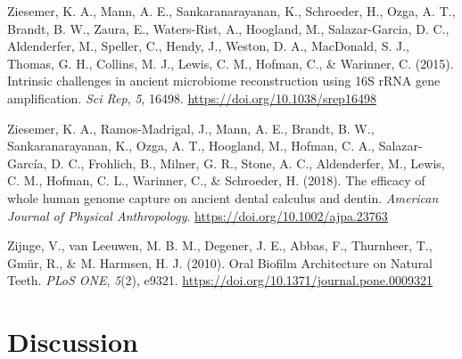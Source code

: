 \documentclass[
  b5paper,
]{book}
\newlength{\cslhangindent}
\newenvironment{CSLReferences}[2] %
 {\begin{list}{}{%
  \setlength{\itemindent}{0pt}
  \setlength{\leftmargin}{0pt}
  \setlength{\parsep}{0pt}
  \ifodd #1
   \setlength{\leftmargin}{\cslhangindent}
   \setlength{\itemindent}{-1\cslhangindent}
  \fi
  \setlength{\itemsep}{#2\baselineskip}}}
 {\end{list}}
\begin{document}
\begin{CSLReferences}{1}{0}
Ziesemer, K. A., Mann, A. E., Sankaranarayanan, K., Schroeder, H., Ozga,
A. T., Brandt, B. W., Zaura, E., Waters-Rist, A., Hoogland, M.,
Salazar-Garcia, D. C., Aldenderfer, M., Speller, C., Hendy, J., Weston,
D. A., MacDonald, S. J., Thomas, G. H., Collins, M. J., Lewis, C. M.,
Hofman, C., \& Warinner, C. (2015). Intrinsic challenges in ancient
microbiome reconstruction using {16S rRNA} gene amplification. \emph{Sci
Rep}, \emph{5}, 16498. \url{https://doi.org/10.1038/srep16498}

Ziesemer, K. A., Ramos-Madrigal, J., Mann, A. E., Brandt, B. W.,
Sankaranarayanan, K., Ozga, A. T., Hoogland, M., Hofman, C. A.,
Salazar-García, D. C., Frohlich, B., Milner, G. R., Stone, A. C.,
Aldenderfer, M., Lewis, C. M., Hofman, C. L., Warinner, C., \&
Schroeder, H. (2018). The efficacy of whole human genome capture on
ancient dental calculus and dentin. \emph{American Journal of Physical
Anthropology}. \url{https://doi.org/10.1002/ajpa.23763}

Zijnge, V., van Leeuwen, M. B. M., Degener, J. E., Abbas, F., Thurnheer,
T., Gmür, R., \& M. Harmsen, H. J. (2010). Oral {Biofilm Architecture}
on {Natural Teeth}. \emph{PLoS ONE}, \emph{5}(2), e9321.
\url{https://doi.org/10.1371/journal.pone.0009321}

\end{CSLReferences}


\chapter{Discussion}\label{chap-discussion}
\end{document}
